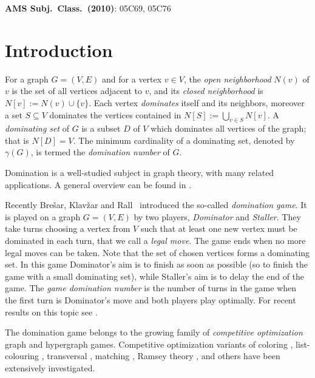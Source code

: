 \documentclass[12pt]{article}
\begin{document}
\noindent
{\bf AMS Subj.\ Class.\ (2010)}: 05C69, 05C76




\section{Introduction}

For a graph $G = (V, E)$ and for a vertex $v \in V$, the \textit{open
neighborhood} $N(v)$ of $v$ is the set of all vertices adjacent to $v$, and its \textit{closed
neighborhood} is $N[v] := N(v) \cup \{v\}$. Each vertex \textit{dominates} itself and its neighbors, moreover a set $S \subseteq V$ dominates the vertices contained in $N[S] :=
\bigcup_{v \in S} N[v]$. A \textit{dominating set} of $G$ is a subset $D$ of $V$ which dominates all vertices of the graph; that is $N[D] = V$. The minimum cardinality of a
dominating set, denoted by $\gamma(G)$, is termed the \textit{domination number} of $G$.

\vspace{2mm}

Domination is a well-studied subject in graph theory, with many related
applications. A general overview can be found in \cite{HHS1998}.

\vspace{2mm}

Recently Bre\v{s}ar, Klav\v{z}ar and Rall~\cite{BKR-SIAM} introduced the so-called \textit{domination game}. It is played on a graph $G=(V,E)$ by two players, \textit{Dominator} and \textit{Staller}. They take turns choosing a vertex from $V$ such that at least one new vertex must be dominated in each turn, that we call a \textit{legal move}. The game ends when no more legal moves can be taken. Note that the set of chosen vertices forms a dominating set. In this game Dominator's aim is to finish as soon as possible (so to finish the game with a small dominating set), while Staller's aim is to delay the end of the game. 
The \textit{game domination number} is the number of turns in the
game when the first turn is Dominator's move and both players play optimally. 
For recent results on this topic see \cite{BDKK-2017,BKR,B1,B2,DKR-2015,HK,KWZ,K-2014,S}.

\vspace{2mm}

The domination game belongs to the growing family  of
\textit{competitive  optimization} graph  and  hypergraph  games.   
Competitive  optimization variants of coloring \cite{KK2009,TZ2014}, list-colouring \cite{BST2007}, transversal \cite{BHT2}, matching \cite{CKOW2013}, Ramsey theory \cite{GHK2004},
and others \cite{PV2014} have been extensively investigated.
\end{document}
